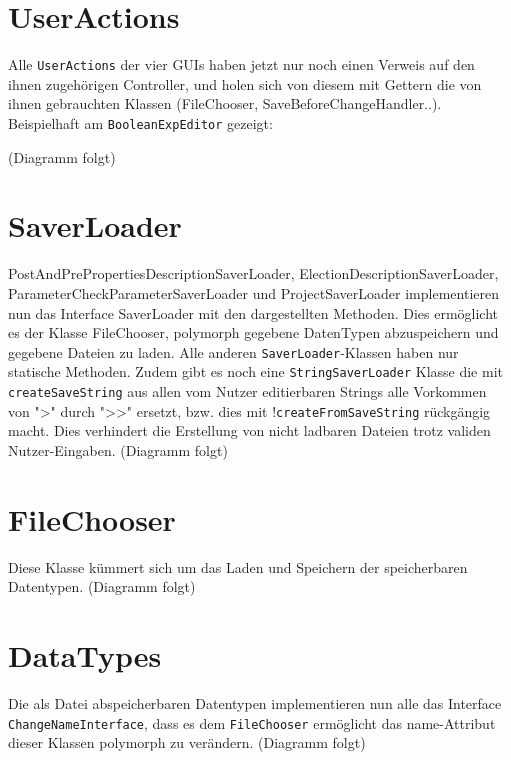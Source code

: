 \documentclass[a4paper]{scrreprt}
\begin{document}
\section{UserActions}
Alle \verb!UserActions! der vier GUIs haben jetzt nur noch einen Verweis auf den ihnen zugehörigen Controller, und holen sich von diesem mit Gettern die von ihnen gebrauchten Klassen (FileChooser, SaveBeforeChangeHandler..). Beispielhaft am \verb!BooleanExpEditor! gezeigt:
\newline

(Diagramm folgt)
\newline

\section{SaverLoader}
PostAndPrePropertiesDescriptionSaverLoader, ElectionDescriptionSaverLoader, ParameterCheckParameterSaverLoader und ProjectSaverLoader implementieren nun das Interface SaverLoader mit den dargestellten Methoden. Dies ermöglicht es der Klasse FileChooser, polymorph gegebene DatenTypen abzuspeichern und gegebene Dateien zu laden.
Alle anderen \verb!SaverLoader!-Klassen haben nur statische Methoden.
Zudem gibt es noch eine \verb!StringSaverLoader! Klasse die mit \verb!createSaveString! aus allen vom Nutzer editierbaren Strings alle Vorkommen von ">" durch ">>" ersetzt, bzw. dies mit !\verb!createFromSaveString! rückgängig macht. Dies verhindert die Erstellung von nicht ladbaren Dateien trotz validen Nutzer-Eingaben.
\newline
(Diagramm folgt)
\newline

\section{FileChooser}
Diese Klasse kümmert sich um das Laden und Speichern der speicherbaren Datentypen.
\newline
(Diagramm folgt)
\newline

\section{DataTypes}
Die als Datei abspeicherbaren Datentypen implementieren nun alle das Interface \verb!ChangeNameInterface!, dass es dem \verb!FileChooser! ermöglicht das name-Attribut dieser Klassen polymorph zu verändern.
\newline
(Diagramm folgt)
\newline
\end{document}
